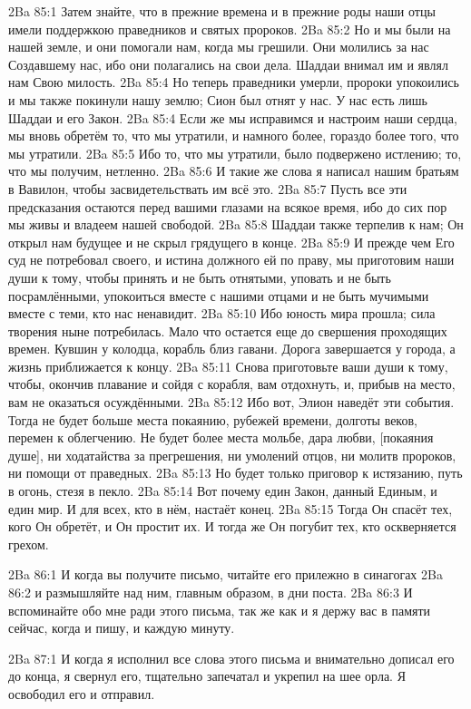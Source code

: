 \vs 2Ba 85:1
Затем знайте, что в прежние времена и в прежние роды наши отцы имели поддержкою праведников и святых пророков.
\vs 2Ba 85:2
Но и мы были на нашей земле, и они помогали нам, когда мы грешили. Они молились за нас Создавшему нас, ибо они полагались на свои дела. Шаддаи внимал им и являл нам Свою милость.
\vs 2Ba 85:4
Но теперь праведники умерли, пророки упокоились и мы также покинули нашу землю; Сион был отнят у нас. У нас есть лишь Шаддаи и его Закон.
\vs 2Ba 85:4
Если же мы исправимся и настроим наши сердца, мы вновь обретём то, что мы утратили, и намного более, гораздо более того, что мы утратили.
\vs 2Ba 85:5
Ибо то, что мы утратили, было подвержено истлению; то, что мы получим, нетленно.
\vs 2Ba 85:6
И такие же слова я написал нашим братьям в Вавилон, чтобы засвидетельствать им всё это.
\vs 2Ba 85:7
Пусть все эти предсказания остаются перед вашими глазами на всякое время, ибо до сих пор мы живы и владеем нашей свободой.
\vs 2Ba 85:8
Шаддаи также терпелив к нам; Он открыл нам будущее и не скрыл грядущего в конце.
\vs 2Ba 85:9
И прежде чем Его суд не потребовал своего, и истина должного ей по праву, мы приготовим наши души к тому, чтобы принять и не быть отнятыми, уповать и не быть посрамлёнными, упокоиться вместе с нашими отцами и не быть мучимыми вместе с теми, кто нас ненавидит.
\vs 2Ba 85:10
Ибо юность мира прошла; сила творения ныне потребилась. Мало что остается еще до свершения проходящих времен. Кувшин у колодца, корабль близ гавани. Дорога завершается у города, а жизнь приближается к концу.
\vs 2Ba 85:11
Снова приготовьте ваши души к тому, чтобы, окончив плавание и сойдя с корабля, вам отдохнуть, и, прибыв на место, вам не оказаться осуждёнными.
\vs 2Ba 85:12
Ибо вот, Элион наведёт эти события. Тогда не будет больше места покаянию, рубежей времени, долготы веков, перемен к облегчению. Не будет более места мольбе, дара любви, [покаяния душе], ни ходатайства за прегрешения, ни умолений отцов, ни молитв пророков, ни помощи от праведных.
\vs 2Ba 85:13
Но будет только приговор к истязанию, путь в огонь, стезя в пекло.
\vs 2Ba 85:14
Вот почему един Закон, данный Единым, и един мир. И для всех, кто в нём, настаёт конец.
\vs 2Ba 85:15
Тогда Он спасёт тех, кого Он обретёт, и Он простит их. И тогда же Он погубит тех, кто оскверняется грехом.

\vs 2Ba 86:1
И когда вы получите письмо, читайте его прилежно в синагогах
\vs 2Ba 86:2
и размышляйте над ним, главным образом, в дни поста.
\vs 2Ba 86:3
И вспоминайте обо мне ради этого письма, так же как и я держу вас в памяти сейчас, когда и пишу, и каждую минуту.

\vs 2Ba 87:1
И когда я исполнил все слова этого письма и внимательно дописал его до конца, я свернул его, тщательно запечатал и укрепил на шее орла. Я освободил его и отправил.
